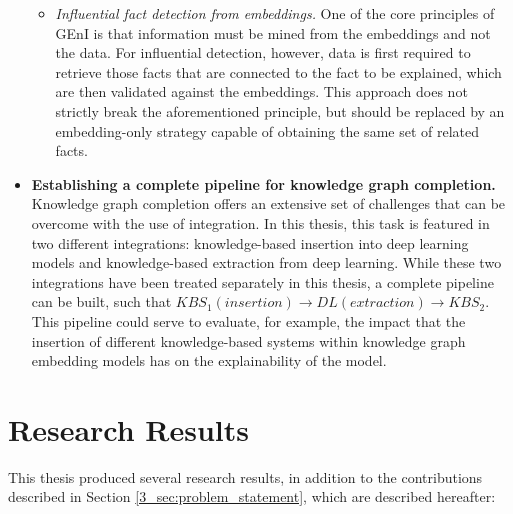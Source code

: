 \begin{itemize}
\begin{itemize}
        \item \textit{Influential fact detection from embeddings.} One of the core principles of GEnI is that information must be mined from the embeddings and not the data. For influential detection, however, data is first required to retrieve those facts that are connected to the fact to be explained, which are then validated against the embeddings. This approach does not strictly break the aforementioned principle, but should be replaced by an embedding-only strategy capable of obtaining the same set of related facts. 
    \end{itemize}
    
    \item \textbf{Establishing a complete pipeline for knowledge graph completion.} Knowledge graph completion offers an extensive set of challenges that can be overcome with the use of integration. In this thesis, this task is featured in two different integrations: knowledge-based insertion into deep learning models and knowledge-based extraction from deep learning. While these two integrations have been treated separately in this thesis, a complete pipeline can be built, such that $KBS_{1} (insertion)\rightarrow DL (extraction)\rightarrow KBS_{2}$. This pipeline could serve to evaluate, for example, the impact that the insertion of different knowledge-based systems within knowledge graph embedding models has on the explainability of the model.
\end{itemize}



\section{Research Results}\label{7_sec:research_results}
This thesis produced several research results, in addition to the contributions described in Section \ref{3_sec:problem_statement}, which are described hereafter:
